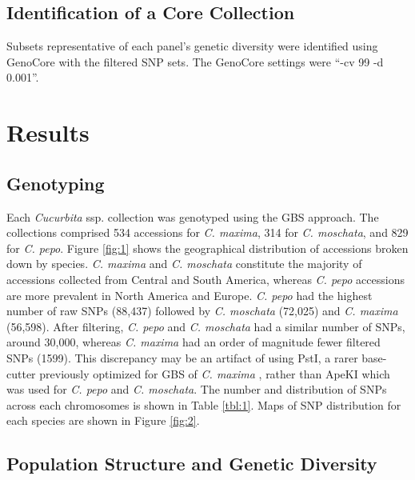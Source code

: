 \documentclass[utf8]{FrontiersinHarvard} %
\begin{document}
\subsection{Identification of a Core Collection}
Subsets representative of each panel’s genetic diversity were identified using GenoCore \citep{Jeong2017} with the filtered SNP sets. The GenoCore settings were “-cv 99 -d 0.001”.


\section{Results}

\subsection{Genotyping}
Each \textit{Cucurbita} ssp. collection was genotyped using the GBS approach. The collections comprised 534 accessions for \textit{C. maxima}, 314 for \textit{C. moschata}, and 829 for \textit{C. pepo}. Figure \ref{fig:1} shows the geographical distribution of accessions broken down by species. \textit{C. maxima} and \textit{C. moschata} constitute the majority of accessions collected from Central and South America, whereas \textit{C. pepo} accessions are more prevalent in North America and Europe. \textit{C. pepo} had the highest number of raw SNPs (88,437) followed by \textit{C. moschata} (72,025) and \textit{C. maxima} (56,598). After filtering, \textit{C. pepo} and \textit{C. moschata} had a similar number of SNPs, around 30,000, whereas \textit{C. maxima} had an order of magnitude fewer filtered SNPs (1599). This discrepancy may be an artifact of using PstI, a rarer base-cutter previously optimized for GBS of \textit{C. maxima} \citep{Zhang2015} , rather than ApeKI which was used for \textit{C. pepo} and \textit{C. moschata}. The number and distribution of SNPs across each chromosomes is shown in Table \ref{tbl:1}. Maps of SNP distribution for each species are shown in Figure \ref{fig:2}.

\subsection{Population Structure and Genetic Diversity}
\end{document}
